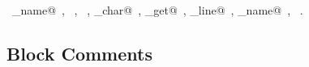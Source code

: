 \documentclass[a4paper]{report}
\begin{document}
\begin{flushleft}
\begin{minipage}{\linewidth}
\begin{list}{}{\setlength{\itemsep}{-\parsep}\setlength{\itemindent}{-\leftmargin}}
\item \NWtxtIdentsUsed\nobreak\  \verb@command_name@\nobreak\ , \verb@exit@\nobreak\ , \verb@fprintf@\nobreak\ , \verb@nw_char@\nobreak\ , \verb@source_get@\nobreak\ , \verb@source_line@\nobreak\ , \verb@source_name@\nobreak\ , \verb@stderr@\nobreak\ .
\item{}
\end{list}
\end{minipage}\vspace{4ex}
\end{flushleft}
\subsection{Block Comments}
\end{document}
